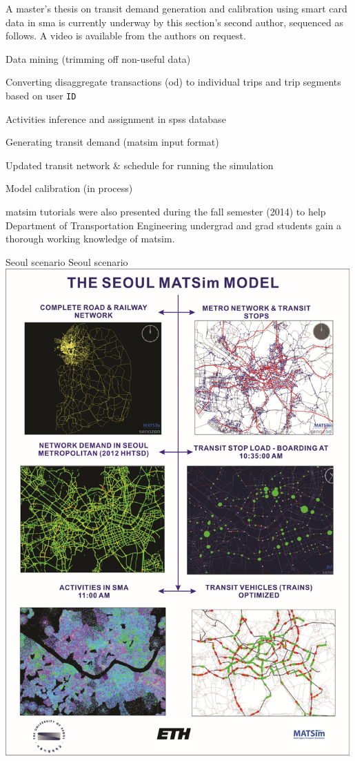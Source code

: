 A master's thesis on transit demand generation and calibration using smart card data in \gls{sma} is currently underway by this section's second author, sequenced as follows. A video is available from the authors on request.
%
\begin{compactitem}
\item Data mining (trimming off non-useful data)
\item	Converting disaggregate transactions (\gls{od}) to individual trips and trip segments based on user \lstinline|ID|
\item	Activities inference and assignment in \gls{spss} database
\item	Generating transit demand (\gls{matsim} input format)
\item	Updated transit network \& schedule for running the simulation
\item	Model calibration (in process)
\end{compactitem}
%
\gls{matsim} tutorials were also presented during the fall semester (2014) to help Department of Transportation Engineering undergrad and grad students gain a thorough working knowledge of \gls{matsim}.

\createfigure%
{Seoul scenario}%
{Seoul scenario}%
{\label{fig:seoul}}%
{\includegraphics[width=0.99\textwidth, angle=0]{using/figures/seoul}}%
{}

 
 
